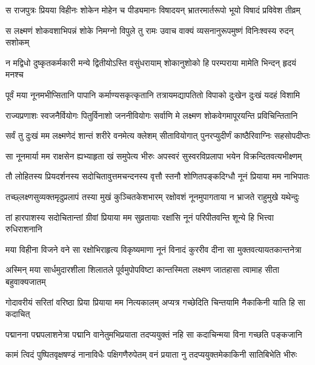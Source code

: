 
\twolineshloka
{स राजपुत्रः प्रियया विहीनः शोकेन मोहेन च पीड्यमानः}
{विषादयन् भ्रातरमार्तरूपो भूयो विषादं प्रविवेश तीव्रम्} %

\twolineshloka
{स लक्ष्मणं शोकवशाभिपन्नं शोके निमग्नो विपुले तु रामः}
{उवाच वाक्यं व्यसनानुरूपमुष्णं विनिःश्वस्य रुदन् सशोकम्} %

\twolineshloka
{न मद्विधो दुष्कृतकर्मकारी मन्ये द्वितीयोऽस्ति वसुंधरायाम्}
{शोकानुशोको हि परम्पराया मामेति भिन्दन् हृदयं मनश्च} %

\twolineshloka
{पूर्वं मया नूनमभीप्सितानि पापानि कर्माण्यसकृत्कृतानि}
{तत्रायमद्यापतितो विपाको दुःखेन दुःखं यदहं विशामि} %

\twolineshloka
{राज्यप्रणाशः स्वजनैर्वियोगः पितुर्विनाशो जननीवियोगः}
{सर्वाणि मे लक्ष्मण शोकवेगमापूरयन्ति प्रविचिन्तितानि} %

\twolineshloka
{सर्वं तु दुःखं मम लक्ष्मणेदं शान्तं शरीरे वनमेत्य क्लेशम्}
{सीतावियोगात् पुनरप्युदीर्णं काष्ठैरिवाग्निः सहसोपदीप्तः} %

\twolineshloka
{सा नूनमार्या मम राक्षसेन ह्यभ्याहृता खं समुपेत्य भीरुः}
{अपस्वरं सुस्वरविप्रलापा भयेन विक्रन्दितवत्यभीक्ष्णम्} %

\twolineshloka
{तौ लोहितस्य प्रियदर्शनस्य सदोचितावुत्तमचन्दनस्य}
{वृत्तौ स्तनौ शोणितपङ्कदिग्धौ नूनं प्रियाया मम नाभिपातः} %

\twolineshloka
{तच्छ्लक्ष्णसुव्यक्तमृदुप्रलापं तस्या मुखं कुञ्चितकेशभारम्}
{रक्षोवशं नूनमुपागताया न भ्राजते राहुमुखे यथेन्दुः} %

\twolineshloka
{तां हारपाशस्य सदोचितान्तां ग्रीवां प्रियाया मम सुव्रतायाः}
{रक्षांसि नूनं परिपीतवन्ति शून्ये हि भित्त्वा रुधिराशनानि} %

\twolineshloka
{मया विहीना विजने वने सा रक्षोभिराहृत्य विकृष्यमाणा}
{नूनं विनादं कुररीव दीना सा मुक्तवत्यायतकान्तनेत्रा} %

\twolineshloka
{अस्मिन् मया सार्धमुदारशीला शिलातले पूर्वमुपोपविष्टा}
{कान्तस्मिता लक्ष्मण जातहासा त्वामाह सीता बहुवाक्यजातम्} %

\twolineshloka
{गोदावरीयं सरितां वरिष्ठा प्रिया प्रियाया मम नित्यकालम्}
{अप्यत्र गच्छेदिति चिन्तयामि नैकाकिनी याति हि सा कदाचित्} %

\twolineshloka
{पद्मानना पद्मपलाशनेत्रा पद्मानि वानेतुमभिप्रयाता}
{तदप्ययुक्तं नहि सा कदाचिन्मया विना गच्छति पङ्कजानि} %

\twolineshloka
{कामं त्विदं पुष्पितवृक्षषण्डं नानाविधैः पक्षिगणैरुपेतम्}
{वनं प्रयाता नु तदप्ययुक्तमेकाकिनी सातिबिभेति भीरुः} %

